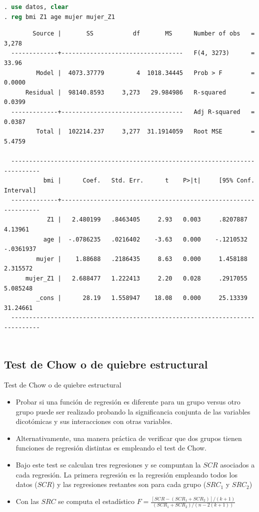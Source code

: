 \begin{frame}[fragile]
	\begin{lstlisting}[language=Stata, numbers=none]
. use datos, clear
. reg bmi Z1 age mujer mujer_Z1
	\end{lstlisting}
	\scriptsize{
		\begin{verbatim}
        Source |       SS           df       MS      Number of obs   =     3,278
  -------------+----------------------------------   F(4, 3273)      =     33.96
         Model |  4073.37779         4  1018.34445   Prob > F        =    0.0000
      Residual |  98140.8593     3,273   29.984986   R-squared       =    0.0399
  -------------+----------------------------------   Adj R-squared   =    0.0387
         Total |  102214.237     3,277  31.1914059   Root MSE        =    5.4759
  
  ------------------------------------------------------------------------------
           bmi |      Coef.   Std. Err.      t    P>|t|     [95% Conf. Interval]
  -------------+----------------------------------------------------------------
            Z1 |   2.480199   .8463405     2.93   0.003     .8207887     4.13961
           age |  -.0786235   .0216402    -3.63   0.000    -.1210532   -.0361937
         mujer |    1.88688   .2186435     8.63   0.000     1.458188    2.315572
      mujer_Z1 |   2.688477   1.222413     2.20   0.028     .2917055    5.085248
         _cons |      28.19   1.558947    18.08   0.000     25.13339    31.24661
  ------------------------------------------------------------------------------
			
		\end{verbatim}
	}
\end{frame}

\subsection{Test de Chow o de quiebre estructural}
\begin{frame}{Test de Chow o de quiebre estructural}
	\begin{itemize}
		\item Probar si una función de regresión es diferente para un grupo versus otro grupo puede ser realizado probando la significancia conjunta
		de las variables dicotómicas y sus interacciones con otras variables.
		\pause
		\item Alternativamente, una manera práctica de verificar que dos grupos tienen funciones de regresión distintas es empleando el test de
		Chow.
		\pause
		\item Bajo este test se calculan tres regresiones y se compuntan la $SCR$ asociados a cada regresión. La primera regresión es la regresión
		empleando todos los datos ($SCR$) y las regresiones restantes son para cada grupo ($SRC_{1}$ y $SRC_{2}$)
		\pause
		\item Con las $SRC$ se computa el estadí­stico $F=\frac{[SCR-(SCR_{1}+SCR_{2})]/(k+1)}{(SCR_{1}+SCR_{2})/(n-2(k+1))}$
	\end{itemize}
\end{frame}